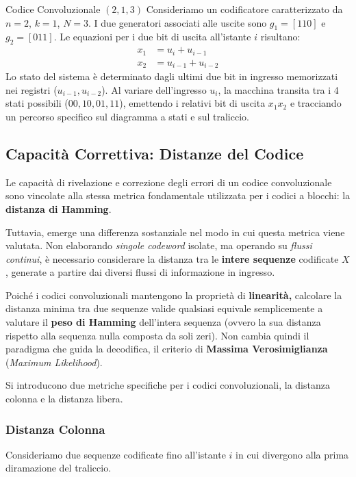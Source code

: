 \begin{esempio}{Codice Convoluzionale $(2,1,3)$} 
Consideriamo un codificatore caratterizzato da $n=2$, $k=1$, $N=3$. 
I due generatori associati alle uscite sono $g_1 = [110]$ e $g_2 = [011]$. 
Le equazioni per i due bit di uscita all'istante $i$ risultano:
\begin{align*}
    x_1 &= u_i + u_{i-1} \\
    x_2 &= u_{i-1} + u_{i-2}
\end{align*}
Lo stato del sistema è determinato dagli ultimi due bit in ingresso memorizzati nei registri ($u_{i-1}, u_{i-2}$). Al variare dell'ingresso $u_i$, la macchina transita tra i 4 stati possibili ($00, 10, 01, 11$), emettendo i relativi bit di uscita $x_1 x_2$ e tracciando un percorso specifico sul diagramma a stati e sul traliccio.
\end{esempio}
\subsection{Capacità Correttiva: Distanze del Codice}

Le capacità di rivelazione e correzione degli errori di un codice convoluzionale sono vincolate alla stessa metrica fondamentale utilizzata per i codici a blocchi: la \textbf{distanza di Hamming}.

Tuttavia, emerge una differenza sostanziale nel modo in cui questa metrica viene valutata. Non elaborando \textit{singole codeword} isolate, ma operando su \textit{flussi continui}, è necessario considerare la distanza tra le \textbf{intere sequenze} codificate $X$, generate a partire dai diversi flussi di informazione in ingresso.

Poiché i codici convoluzionali mantengono la proprietà di \textbf{linearità,} calcolare la distanza minima tra due sequenze valide qualsiasi equivale semplicemente a valutare il \textbf{peso di Hamming} dell'intera sequenza (ovvero la sua distanza rispetto alla sequenza nulla composta da soli zeri).
Non cambia quindi il paradigma che guida la decodifica, il criterio di \textbf{Massima Verosimiglianza} (\textit{Maximum Likelihood}).

Si introducono due metriche specifiche per i codici convoluzionali, la distanza colonna e la distanza libera.

\subsubsection{Distanza Colonna}
Consideriamo due sequenze codificate fino all'istante $i$ in cui divergono alla prima diramazione del traliccio.

